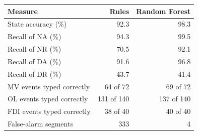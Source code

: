 \begin{tabular}{@{}lrr@{}}
\toprule
Measure & Rules & Random Forest \\
\midrule
State accuracy (\%) & 92.3 & 98.3 \\
Recall of NA (\%) & 94.3 & 99.5 \\
Recall of NR (\%) & 70.5 & 92.1 \\
Recall of DA (\%) & 91.6 & 96.8 \\
Recall of DR (\%) & 43.7 & 41.4 \\
\midrule
MV events typed correctly & 64 of 72 & 69 of 72 \\
OL events typed correctly & 131 of 140 & 137 of 140 \\
FDI events typed correctly & 38 of 40 & 40 of 40 \\
False-alarm segments & 333 & 4 \\
\bottomrule
\end{tabular}
